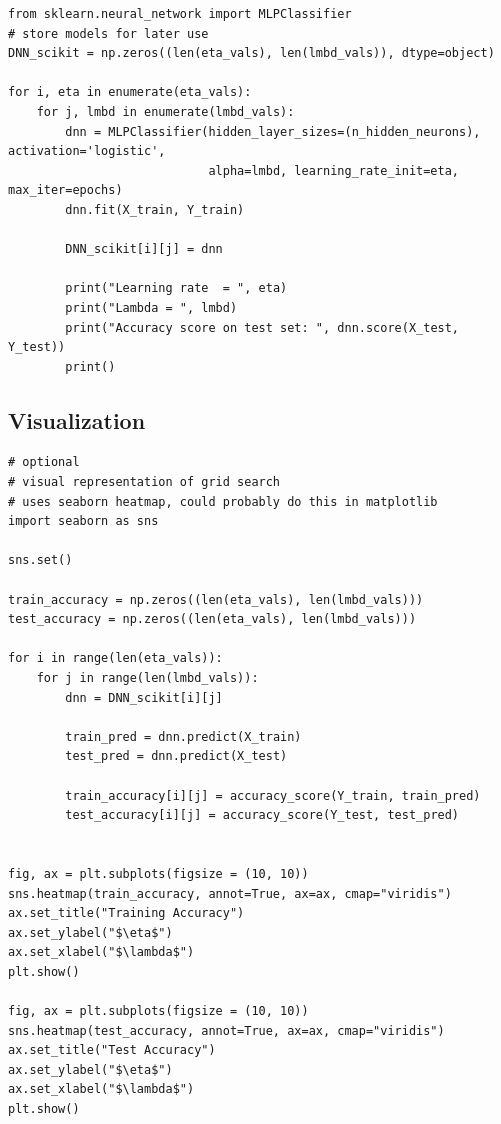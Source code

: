 \documentclass[%
oneside,                 %
final,                   %
10pt]{article}
\begin{document}
\begin{verbatim}
from sklearn.neural_network import MLPClassifier
# store models for later use
DNN_scikit = np.zeros((len(eta_vals), len(lmbd_vals)), dtype=object)

for i, eta in enumerate(eta_vals):
    for j, lmbd in enumerate(lmbd_vals):
        dnn = MLPClassifier(hidden_layer_sizes=(n_hidden_neurons), activation='logistic',
                            alpha=lmbd, learning_rate_init=eta, max_iter=epochs)
        dnn.fit(X_train, Y_train)
        
        DNN_scikit[i][j] = dnn
        
        print("Learning rate  = ", eta)
        print("Lambda = ", lmbd)
        print("Accuracy score on test set: ", dnn.score(X_test, Y_test))
        print()
\end{verbatim}


\subsection*{Visualization}
\begin{verbatim}
# optional
# visual representation of grid search
# uses seaborn heatmap, could probably do this in matplotlib
import seaborn as sns

sns.set()

train_accuracy = np.zeros((len(eta_vals), len(lmbd_vals)))
test_accuracy = np.zeros((len(eta_vals), len(lmbd_vals)))

for i in range(len(eta_vals)):
    for j in range(len(lmbd_vals)):
        dnn = DNN_scikit[i][j]
        
        train_pred = dnn.predict(X_train) 
        test_pred = dnn.predict(X_test)

        train_accuracy[i][j] = accuracy_score(Y_train, train_pred)
        test_accuracy[i][j] = accuracy_score(Y_test, test_pred)

        
fig, ax = plt.subplots(figsize = (10, 10))
sns.heatmap(train_accuracy, annot=True, ax=ax, cmap="viridis")
ax.set_title("Training Accuracy")
ax.set_ylabel("$\eta$")
ax.set_xlabel("$\lambda$")
plt.show()

fig, ax = plt.subplots(figsize = (10, 10))
sns.heatmap(test_accuracy, annot=True, ax=ax, cmap="viridis")
ax.set_title("Test Accuracy")
ax.set_ylabel("$\eta$")
ax.set_xlabel("$\lambda$")
plt.show()
\end{verbatim}
\end{document}

